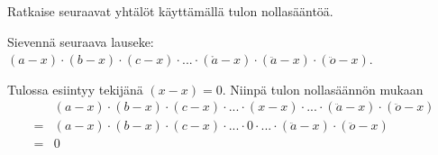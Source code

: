 \begin{tehtavasivu}
\begin{tehtava}
    Ratkaise seuraavat yhtälöt käyttämällä tulon nollasääntöä.
    \begin{alakohdat}
    \end{alakohdat}
    \begin{vastaus}
        \begin{alakohdat}
        \end{alakohdat}
    \end{vastaus}
\end{tehtava}

\begin{tehtava}
    Sievennä seuraava lauseke: $(a-x)\cdot(b-x)\cdot(c-x)\cdot...\cdot(\mathring{a}-x)\cdot(\ddot{a}-x)\cdot(\ddot{o}-x)$.
    \begin{vastaus}
        Tulossa esiintyy tekijänä $(x-x)=0$. Niinpä tulon nollasäännön mukaan
        \begin{align*}
            &(a-x)\cdot(b-x)\cdot(c-x)\cdot...\cdot(x-x)\cdot...\cdot(\ddot{a}-x)\cdot(\ddot{o}-x) \\
            =&(a-x)\cdot(b-x)\cdot(c-x)\cdot...\cdot 0\cdot...\cdot(\ddot{a}-x)\cdot(\ddot{o}-x) \\
            =&0
        \end{align*}
    \end{vastaus}
\end{tehtava}

\end{tehtavasivu}
